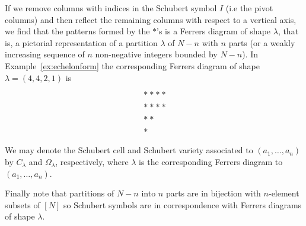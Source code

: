 \documentclass[a4paper,openany]{scrbook}
\begin{document}
\begin{remark}
If we remove columns with indices in the Schubert symbol $I$ (i.e the pivot columns) and then reflect the remaining columns with respect to a vertical axis, we find that the patterns formed by the $*$'s is a Ferrers diagram of shape $\lambda$, that is, a pictorial representation of a partition $\lambda$ of $N-n$ with $n$ parts (or a weakly increasing sequence of $n$ non-negative integers bounded by $N-n$). In Example~\ref{ex:echelonform} the corresponding Ferrers diagram of shape $\lambda = (4,4,2,1)$ is
\begin{align*}
\displaystyle &**** \\	
	      &**** \\   
	      &**   \\
	      &\hspace{0.08cm} * 
\end{align*} \noindent

We may denote the Schubert cell and Schubert variety associated to $(a_1,\dots ,a_n)$ by $C_\lambda$ and $\Omega_\lambda$, respectively, where $\lambda$ is the corresponding Ferrers diagram to $(a_1,\dots ,a_n)$. 

Finally note that partitions of $N-n$ into $n$ parts are in bijection with $n$-element subsets of $[N]$ so Schubert symbols are in correspondence with Ferrers diagrams of shape $\lambda$.
\end{remark} \noindent
\end{document}
